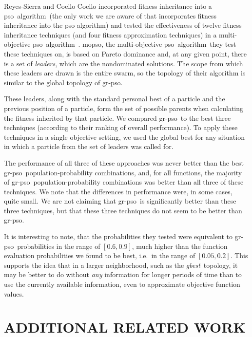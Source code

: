 \documentclass[a4paper,twoside]{article}
\newcommand{\pso}{{\sc pso}}
\newcommand{\cfe}{{\sc gr-pso}}
\newcommand{\alg}{algorithm}
\newcommand{\psoalg}{{\sc pso} algorithm}
\newcommand{\gbn}{\emph{gbest}}
\begin{document}
Reyes-Sierra and Coello Coello incorporated fitness inheritance into a \pso\ \alg\ (the only work we are aware of that incorporates fitness inheritance into the \psoalg) and tested the effectiveness of twelve fitness inheritance techniques (and four fitness approximation techniques) in a multi-objective \pso\ \alg~\cite{reyes-sierra07}.  {\sc mopso}, the multi-objective \pso\ \alg\ they test these techniques on, is based on Pareto dominance and, at any given point, there is a set of \emph{leaders}, which are the nondominated solutions. The scope from which these leaders are drawn is the entire swarm, so the topology of their algorithm is similar to the global topology of \cfe.

These leaders, along with the standard personal best of a particle and the previous position of a particle, form the set of possible parents when calculating the fitness inherited by that particle.  We compared \cfe\ to the best three techniques (according to their ranking of overall performance). 
To apply these techniques in a single objective setting, we used the global best for any situation in which a particle from the set of leaders was called for. 

The performance of all three of these approaches was never better than the best \cfe\ population-probability combinations, and, for all functions, the majority of \cfe\ population-probability combinations was 
better than all three of these techniques.
 We note that the differences in performance were, in some cases, quite small.  We are not claiming that \cfe\ is significantly better than these three techniques, but that these three techniques do not seem to be better than \cfe.

It is interesting to note, that the probabilities they tested were equivalent to \cfe\ probabilities in the range of $[0.6,0.9]$, much higher than the function evaluation probabilities we found to be best, i.e.\ in the range of $[0.05,0.2]$.  This supports the idea that in a larger neighborhood, such as the \gbn\ topology, it may be better to do without \emph{any} information for longer periods of time than to use the currently available information, even to approximate objective function values.
 



\section{\uppercase{Additional Related Work}}
\label{s:related-work}
\end{document}
